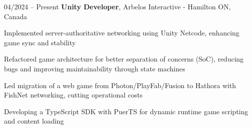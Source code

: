 \begin{twocolentry}{
    04/2024 – Present
}
\fontsize{11 pt}{11 pt}\textbf{Unity Developer}, Arbelos Interactive - Hamilton ON, Canada \end{twocolentry}

\vspace{0.10 cm}
\begin{onecolentry}
   \begin{highlights}
       \item Implemented server-authoritative networking using Unity Netcode, enhancing game sync and stability
       \item Refactored game architecture for better separation of concerns (SoC), reducing bugs and improving maintainability through state machines
       \item Led migration of a web game from Photon/PlayFab/Fusion to Hathora with FishNet networking, cutting operational costs
       \item Developing a TypeScript SDK with PuerTS for dynamic runtime game scripting and content loading
   \end{highlights}
\end{onecolentry}